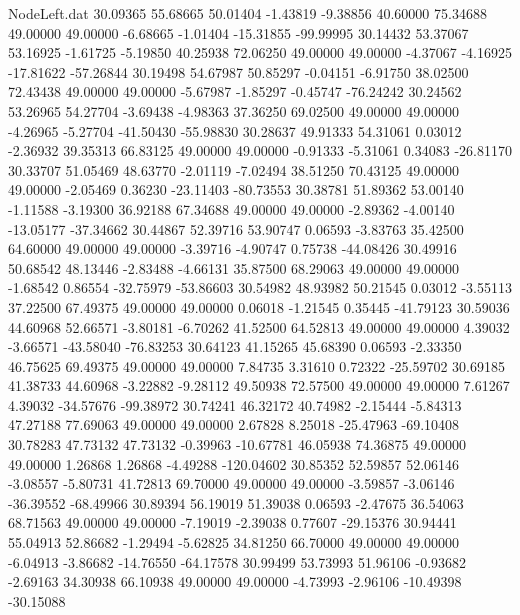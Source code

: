 \begin{filecontents}{NodeLeft.dat}
  30.09365   55.68665   50.01404    -1.43819   -9.38856   40.60000   75.34688   49.00000   49.00000   -6.68665   -1.01404  -15.31855  -99.99995
  30.14432   53.37067   53.16925    -1.61725   -5.19850   40.25938   72.06250   49.00000   49.00000   -4.37067   -4.16925  -17.81622  -57.26844
  30.19498   54.67987   50.85297    -0.04151   -6.91750   38.02500   72.43438   49.00000   49.00000   -5.67987   -1.85297   -0.45747  -76.24242
  30.24562   53.26965   54.27704    -3.69438   -4.98363   37.36250   69.02500   49.00000   49.00000   -4.26965   -5.27704  -41.50430  -55.98830
  30.28637   49.91333   54.31061     0.03012   -2.36932   39.35313   66.83125   49.00000   49.00000   -0.91333   -5.31061    0.34083  -26.81170
  30.33707   51.05469   48.63770    -2.01119   -7.02494   38.51250   70.43125   49.00000   49.00000   -2.05469    0.36230  -23.11403  -80.73553
  30.38781   51.89362   53.00140    -1.11588   -3.19300   36.92188   67.34688   49.00000   49.00000   -2.89362   -4.00140  -13.05177  -37.34662
  30.44867   52.39716   53.90747     0.06593   -3.83763   35.42500   64.60000   49.00000   49.00000   -3.39716   -4.90747    0.75738  -44.08426
  30.49916   50.68542   48.13446    -2.83488   -4.66131   35.87500   68.29063   49.00000   49.00000   -1.68542    0.86554  -32.75979  -53.86603
  30.54982   48.93982   50.21545     0.03012   -3.55113   37.22500   67.49375   49.00000   49.00000    0.06018   -1.21545    0.35445  -41.79123
  30.59036   44.60968   52.66571    -3.80181   -6.70262   41.52500   64.52813   49.00000   49.00000    4.39032   -3.66571  -43.58040  -76.83253
  30.64123   41.15265   45.68390     0.06593   -2.33350   46.75625   69.49375   49.00000   49.00000    7.84735    3.31610    0.72322  -25.59702
  30.69185   41.38733   44.60968    -3.22882   -9.28112   49.50938   72.57500   49.00000   49.00000    7.61267    4.39032  -34.57676  -99.38972
  30.74241   46.32172   40.74982    -2.15444   -5.84313   47.27188   77.69063   49.00000   49.00000    2.67828    8.25018  -25.47963  -69.10408
  30.78283   47.73132   47.73132    -0.39963  -10.67781   46.05938   74.36875   49.00000   49.00000    1.26868    1.26868   -4.49288 -120.04602
  30.85352   52.59857   52.06146    -3.08557   -5.80731   41.72813   69.70000   49.00000   49.00000   -3.59857   -3.06146  -36.39552  -68.49966
  30.89394   56.19019   51.39038     0.06593   -2.47675   36.54063   68.71563   49.00000   49.00000   -7.19019   -2.39038    0.77607  -29.15376
  30.94441   55.04913   52.86682    -1.29494   -5.62825   34.81250   66.70000   49.00000   49.00000   -6.04913   -3.86682  -14.76550  -64.17578
  30.99499   53.73993   51.96106    -0.93682   -2.69163   34.30938   66.10938   49.00000   49.00000   -4.73993   -2.96106  -10.49398  -30.15088

\end{filecontents}
